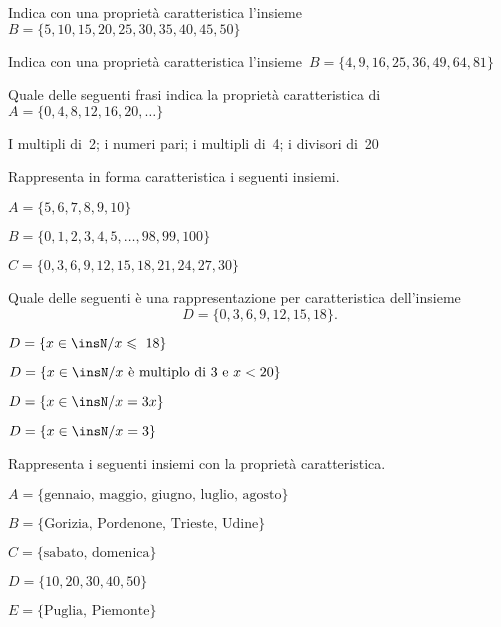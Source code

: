 \begin{esercizio}
\label{ese:6.12}
Indica con una proprietà caratteristica l'insieme~$B=\{5, 10, 15, 20, 25, 30, 
35, 40, 45, 50\}$
\end{esercizio}

\begin{esercizio}
\label{ese:6.13}
Indica con una proprietà caratteristica
l'insieme~$B=\{4, 9, 16, 25, 36, 49, 64, 81\}$
\end{esercizio}

\begin{esercizio}
\label{ese:6.14}
Quale delle seguenti frasi indica la proprietà caratteristica
di~$A=\{0, 4, 8, 12, 16, 20, \ldots\}$
\begin{center}
\boxA\quad I multipli di~2; \quad\boxB\quad i numeri pari; \quad\boxC\quad i 
multipli di~4; \quad\boxD\quad i divisori di~20
\end{center}
\end{esercizio}

\begin{esercizio}
\label{ese:6.15}
Rappresenta in forma caratteristica i seguenti insiemi.
\begin{enumeratea}
\item $A=\{5, 6, 7, 8, 9, 10\}$
\item $B=\{0, 1, 2, 3, 4, 5, \dots, 98, 99, 100\}$
\item$ C=\{0, 3, 6, 9, 12, 15, 18, 21, 24, 27, 30\}$
\end{enumeratea}
\end{esercizio}

\begin{esercizio}
\label{ese:6.16}
Quale delle seguenti è una rappresentazione per caratteristica
dell'insieme
\[D = \{0, 3, 6, 9, 12, 15, 18\}.\]
\begin{multicols}{2}
\begin{enumeratea}
\item $D=\{x\in\insN/x\leqslant~18\}$
\item $D=\{x\in\insN/x\text{ è multiplo di~3 e }x<20\}$%
\item $D=\{x\in\insN/x=3x\}$
\item $D=\{x\in\insN/x=3\}$
\end{enumeratea}
\end{multicols}
\end{esercizio}

\begin{esercizio}
\label{ese:6.17}
Rappresenta i seguenti insiemi con la proprietà caratteristica.
\begin{enumeratea}
 \item $A=\{\text{gennaio, maggio, giugno, luglio, agosto}\}$
 \item $B=\{\text{Gorizia, Pordenone, Trieste, Udine}\}$
 \item $C=\{\text{sabato, domenica}\}$
 \item $D=\{10, 20, 30, 40, 50\}$
 \item $E=\{\text{Puglia, Piemonte}\}$
 \end{enumeratea}
\end{esercizio}

